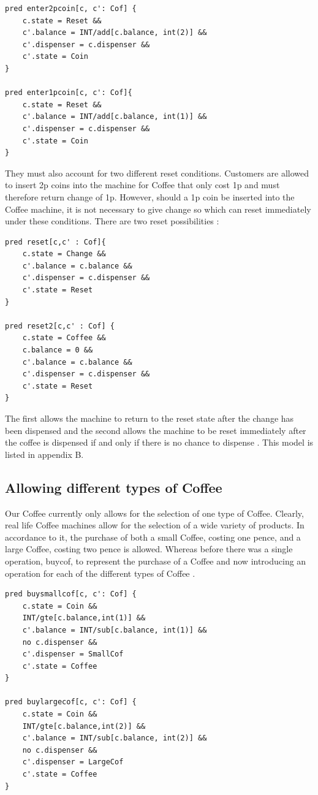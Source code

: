 \documentclass[a4paper,10pt]{report}
\begin{document}
\begin{verbatim}
pred enter2pcoin[c, c': Cof] {
	c.state = Reset &&
	c'.balance = INT/add[c.balance, int(2)] &&
	c'.dispenser = c.dispenser &&
	c'.state = Coin
}

pred enter1pcoin[c, c': Cof]{
	c.state = Reset &&
	c'.balance = INT/add[c.balance, int(1)] &&
	c'.dispenser = c.dispenser &&
	c'.state = Coin
}
\end{verbatim}
They must also account for two different reset conditions. Customers are allowed to insert 2p coins into the machine for Coffee that only cost 1p and must therefore return change of 1p. However, should a 1p coin be inserted into the Coffee machine, it is not necessary to give change so which can reset immediately under these conditions. There are two reset possibilities \cite{Boyatt}:

\begin{verbatim}
pred reset[c,c' : Cof]{
	c.state = Change &&
	c'.balance = c.balance &&
	c'.dispenser = c.dispenser &&
	c'.state = Reset
}

pred reset2[c,c' : Cof] {
	c.state = Coffee &&
	c.balance = 0 &&
	c'.balance = c.balance &&
	c'.dispenser = c.dispenser &&
	c'.state = Reset
}
\end{verbatim}

The first allows the machine to return to the reset state after the change has been dispensed and the second allows the machine to be reset immediately after the coffee is dispensed if and only if there is no chance to dispense \cite{Boyatt}. This model is listed in appendix B.

\subsection{Allowing different types of Coffee}
\label{Different Coffees}

Our Coffee currently only allows for the selection of one type of Coffee. Clearly, real life Coffee machines allow for the selection of a wide variety of products. In accordance to it, the purchase of both a small Coffee, costing one pence, and a large Coffee, costing two pence is allowed. Whereas before there was a single operation, buycof, to represent the purchase of a Coffee and now introducing an operation for each of the different types of Coffee \cite{Boyatt}.

\begin{verbatim}
pred buysmallcof[c, c': Cof] {
	c.state = Coin &&
	INT/gte[c.balance,int(1)] &&
	c'.balance = INT/sub[c.balance, int(1)] &&
	no c.dispenser &&
	c'.dispenser = SmallCof
	c'.state = Coffee
}

pred buylargecof[c, c': Cof] {
	c.state = Coin &&
	INT/gte[c.balance,int(2)] &&
	c'.balance = INT/sub[c.balance, int(2)] &&
	no c.dispenser &&
	c'.dispenser = LargeCof
	c'.state = Coffee
}
\end{verbatim}
\end{document}
